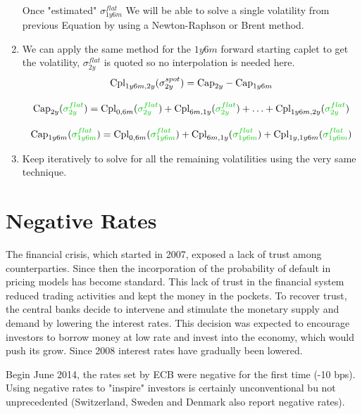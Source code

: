 \documentclass[12pt,a4paper]{article}
\begin{document}
\begin{question}
\begin{enumerate}
Once "estimated" $\sigma^{flat}_{1y6m}$ We will be able to solve a single volatility from previous Equation by using a Newton-Raphson or Brent method.

\item We can apply the same method for the $1y6m$ forward starting caplet to get the volatility, $\sigma^{flat}_{2y}$ is quoted so no interpolation is needed here.
\begin{equation}
\begin{gathered}
\text{Cpl}_{1y6m, 2y}(\sigma^{spot}_{2y})= \text{Cap}_{2y}-\text{Cap}_{1y6m} \\[0.3cm]
\text{Cap}_{2y}(\textcolor{ipython-green}{\sigma^{flat}_{2y}})=\text{Cpl}_{0,6m}(\textcolor{ipython-green}{\sigma^{flat}_{2y}}) + \text{Cpl}_{6m,1y}(\textcolor{ipython-green}{\sigma^{flat}_{2y}}) + \ldots + \text{Cpl}_{1y6m,2y}(\textcolor{ipython-green}{\sigma^{flat}_{2y}}) \\[0.3cm]
\text{Cap}_{1y6m}(\textcolor{ipython-green}{\sigma^{flat}_{1y6m}})=\text{Cpl}_{0,6m}(\textcolor{ipython-green}{\sigma^{flat}_{1y6m}}) + \text{Cpl}_{6m,1y}(\textcolor{ipython-green}{\sigma^{flat}_{1y6m}}) + \text{Cpl}_{1y,1y6m}(\textcolor{ipython-green}{\sigma^{flat}_{1y6m}})
\end{gathered}
\end{equation}

\item Keep iteratively to solve for all the remaining volatilities using the very same technique.
\end{enumerate}
\end{question}
\clearpage

\section{Negative Rates}

The financial crisis, which started in 2007, exposed a lack of trust among counterparties. Since then the incorporation of the probability of default in pricing models has become standard.
This lack of trust in the financial system reduced trading activities and kept the money in the pockets.
To recover trust, the central banks decide to intervene and stimulate the monetary supply and demand by lowering the interest rates.
This decision was expected to encourage investors to borrow money at low rate and invest into the economy, which would push its grow. Since 2008 interest rates have gradually been lowered.

Begin June 2014, the rates set by ECB were negative for the first time (-10 bps). Using negative rates to "inspire" investors is certainly unconventional bu not unprecedented (Switzerland, Sweden and Denmark also report negative rates).
\end{document}
